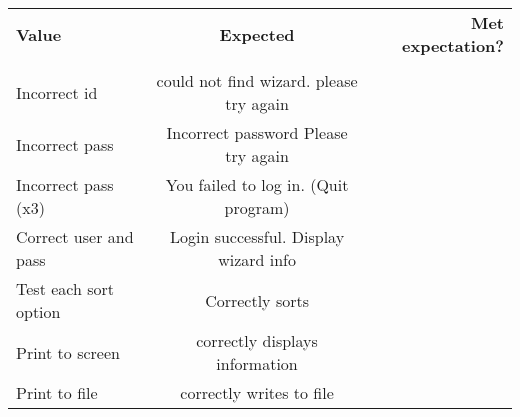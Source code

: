 \documentclass[a4paper, 11pt]{article}
\begin{document}
\begin{center}
 \begin{tabular}{l|c|r} %
   \textbf{Value} & \textbf{Expected} & \textbf{Met expectation?}\\
    &  &  \\
   \hline
   Incorrect id & could not find wizard. please try again  & \\
   Incorrect pass & Incorrect password Please try again & \\
   Incorrect pass (x3) & You failed to log in. (Quit program)  & \\
   Correct user and pass  &Login successful. Display wizard info & \\
   Test each sort option & Correctly sorts & \\
   Print to screen & correctly displays information & \\
   Print to file & correctly writes to file & \\
 \end{tabular}
\end{center} 
\end{document}
